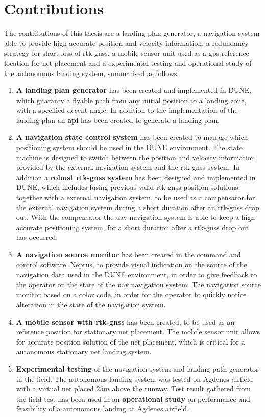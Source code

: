 \section{Contributions}
The contributions of this thesis are a landing plan generator, a navigation system able to provide high accurate position and velocity information, a redundancy strategy for short loss of \gls{rtk-gnss}, a mobile sensor unit used as a \gls{gps} reference location for net placement and a experimental testing and operational study of the autonomous landing system, summarised as follows:
\begin{enumerate}
\item \textbf{A landing plan generator} has been created and implemented in DUNE, which guaranty a flyable path from any initial position to a landing zone, with a specified decent angle. In addition to the implementation of the landing plan an \textbf{\gls{api}} has been created to generate a landing plan.
\item \textbf{A navigation state control system} has been created to manage which positioning system should be used in the DUNE environment. The state machine is designed to switch between the position and velocity information provided by the external navigation system and the \gls{rtk-gnss} system. In addition a \textbf{robust \gls{rtk-gnss} system} has been designed and implemented in DUNE, which includes fusing previous valid \gls{rtk-gnss} position solutions together with a external navigation system, to be used as a compensator for the external navigation system during a short duration after an \gls{rtk-gnss} drop out. With the compensator the \gls{uav} navigation system is able to keep a high accurate positioning system, for a short duration after a \gls{rtk-gnss} drop out has occurred.
\item \textbf{A navigation source monitor} has been created in the command and control software, Neptus, to provide visual indication on the source of the navigation data used in the DUNE environment, in order to give feedback to the operator on the state of the \gls{uav} navigation system. The navigation source monitor based on a color code, in order for the operator to quickly notice alteration in the state of the navigation system.
\item \textbf{A mobile sensor with \gls{rtk-gnss}} has been created, to be used as an reference position for stationary net placement. The mobile sensor unit allows for accurate position solution of the net placement, which is critical for a autonomous stationary net landing system.
\item \textbf{Experimental testing} of the navigation system and landing path generator in the field. The autonomous landing system was tested on Agdenes airfield with a virtual net placed $25 m$ above the runway. Test result gathered from the field test has been used in an \textbf{operational study} on performance and  feasibility of a autonomous landing at Agdenes airfield.
\end{enumerate}
